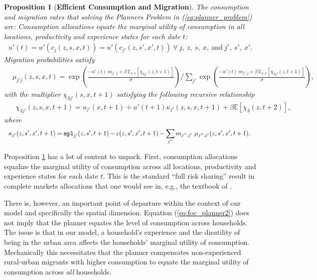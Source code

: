 \documentclass[12pt,pdftex]{article}
\newtheorem{proposition}{Proposition}
\begin{document}
\begin{onehalfspacing}
\begin{proposition}[\textbf{Efficient Consumption and Migration}] \label{prp:efficient} The consumption and migration rates that solving the Planners Problem in (\ref{eq:planner_problem}) are: Consumption allocations equate the marginal utility of consumption in all locations, productivity and experience states for each date $t$:
{\small
\begin{align}
u'(t) = u'(c_{j}(z, s, x, t)) = u'(c_{j'}(z, s', x', t)) \ \forall \ j, \ z, \ s, \ x, \ \mbox{and}  \ j', \ s', \ x'.
\label{eq:foc_planner2}
\end{align}
}
Migration probabilities satisfy
{\footnotesize
\begin{align}
& \mu_{j'j}(z,s,x,t)  =  \exp \left(\frac{- u'(t) \ m_{j',j} + \beta \ \mathbb{E}_{s,x}\left[\chi_{3j'}(z, t+1)\right]}{\sigma} \right)  \Bigg / \sum_{j'} \exp \left( \frac{- u'(t)\ m_{j',j} + \beta \  \mathbb{E}_{s,x}\left[\chi_{3j'}(z, t+1) \right]}{\sigma} \right), \label{eq:migration_prob}
\end{align}
}
with the multiplier $\chi_{3j'}(s, x, t+1)$ satisfying the following recursive relationship
{\small
\begin{align}
& \ \ \chi_{3j'}(z, s, x, t+1) =  u_{j'}(x, t+1) +  u'(t+1) \kappa_{j'}(z, s,x,t+1) + \beta \mathbb{E}\left[\chi_{3}(z, t+2) \right], \label{eq:dynamic_multiplier}
\end{align}}
where
{\small
\begin{align}
& \ \ \kappa_{j'}(z, s',x',t+1) = \mbox{\texttt{mpl}}_{j'}(z,s',t+1) - c(z, s',x',t+1) - \sum_{j''}  m_{j'',j'} \ \mu_{j'',j'}(z, s', x', t+1). \label{eq:kappa}
\end{align}}
\end{proposition}
Proposition \ref{prp:efficient} has a lot of content to unpack. First, consumption allocations equalize the marginal utility of consumption across all locations, productivity and experience states for each date $t$. This is the standard ``full risk sharing'' result in complete markets allocations that one would see in, e.g., the textbook of \citet{ljsa03}.

There is, however, an important point of departure within the context of our model and specifically the spatial dimension. Equation (\ref{eq:foc_planner2}) does not imply that the planner equates the level of consumption across households. The issue is that in our model, a household's experience and the disutility of being in the urban area affects the households' marginal utility of consumption. Mechanically this necessitates that the planner compensates non-experienced rural-urban migrants with higher consumption to equate the marginal utility of consumption across \emph{all} households.


\end{onehalfspacing}
\end{document}
